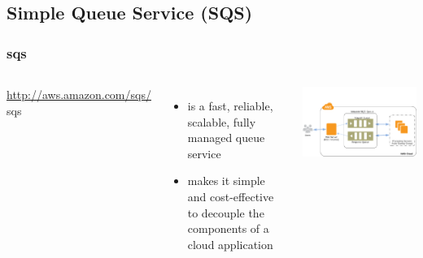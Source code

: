 \documentclass{beamer}
\begin{document}
\subsection{Simple Queue Service (SQS)}
\begin{frame}
\frametitle[\gls{sqs}]{\acrfull{sqs}}

\begin{columns}
\url{http://aws.amazon.com/sqs/}
\gls{sqs} 
\begin{itemize}
 \item is a fast, reliable, scalable, fully managed queue service
  \item makes it simple and cost-effective to decouple the components of a cloud application
\end{itemize}
\includegraphics[width=1.0 \textwidth]{sqs-as-workflow.png}
\end{columns}
\end{frame}
\end{document}
